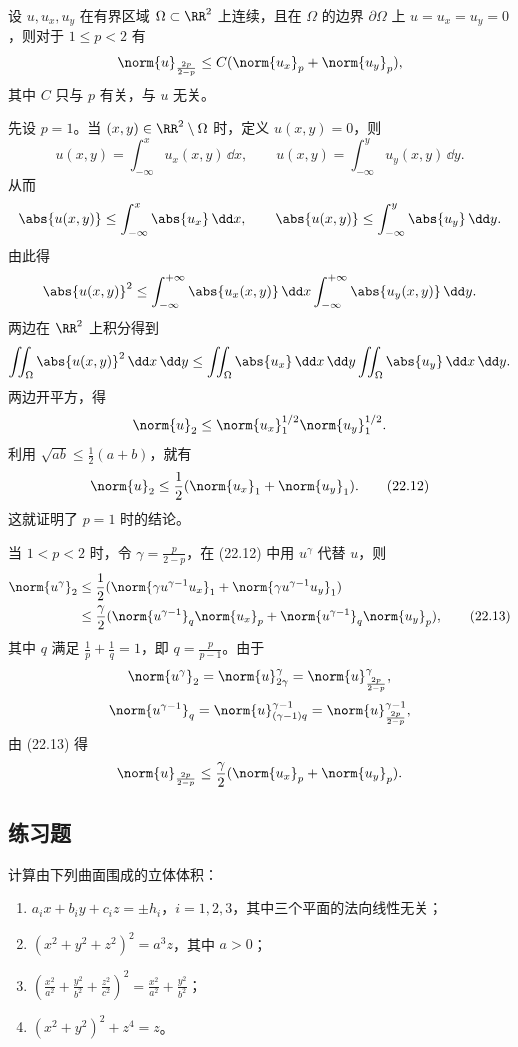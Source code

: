 \begin{xexample}[22.5.10]
设 $u,u_x,u_y$ 在有界区域 $\Omega\subset\RR^2$ 上连续，且在 $\Omega$ 的边界 $\partial\Omega$ 上 $u=u_x=u_y=0$，则对于 $1\le p<2$ 有
\[
  \norm{u}_{\frac{2p}{2-p}}\le C(\norm{u_x}_p+\norm{u_y}_p),
\]
其中 $C$ 只与 $p$ 有关，与 $u$ 无关。
\end{xexample}
\begin{xproof}
先设 $p=1$。当 $(x,y)\in\RR^2\setminus\Omega$ 时，定义 $u(x,y)=0$，则
\[
  u(x,y)=\int_{-\infty}^x u_x(x,y)\,\dd x,
  \qquad
  u(x,y)=\int_{-\infty}^y u_y(x,y)\,\dd y.
\]
从而
\[
  \abs{u(x,y)}\le\int_{-\infty}^x\abs{u_x}\,\dd x,
  \qquad
  \abs{u(x,y)}\le\int_{-\infty}^y\abs{u_y}\,\dd y.
\]
由此得
\[
  \abs{u(x,y)}^2\le\int_{-\infty}^{+\infty}\abs{u_x(x,y)}\,\dd x
  \int_{-\infty}^{+\infty}\abs{u_y(x,y)}\,\dd y.
\]
两边在 $\RR^2$ 上积分得到
\[
  \iint_\Omega\abs{u(x,y)}^2\,\dd x\,\dd y
  \le\iint_\Omega\abs{u_x}\,\dd x\,\dd y\iint_\Omega\abs{u_y}\,\dd x\,\dd y.
\]
两边开平方，得
\[
  \norm{u}_2\le\norm{u_x}_1^{1/2}\norm{u_y}_1^{1/2}.
\]
利用 $\sqrt{ab}\le\frac12(a+b)$，就有
\begin{equation}
  \norm{u}_2\le\frac12(\norm{u_x}_1+\norm{u_y}_1).
  \tag{22.12}
  \label{eq:22.12}
\end{equation}
这就证明了 $p=1$ 时的结论。

当 $1<p<2$ 时，令 $\gamma=\frac p{2-p}$，在 (22.12) 中用 $u^\gamma$ 代替 $u$，则
\begin{align}
  \norm{u^\gamma}_2
  &\le\frac12(\norm{\gamma u^{\gamma-1}u_x}_1+\norm{\gamma u^{\gamma-1}u_y}_1)\notag\\
  &\le\frac\gamma2(\norm{u^{\gamma-1}}_q\norm{u_x}_p+\norm{u^{\gamma-1}}_q\norm{u_y}_p),
  \tag{22.13}
  \label{eq:22.13}
\end{align}
其中 $q$ 满足 $\frac1p+\frac1q=1$，即 $q=\frac p{p-1}$。由于
\[
  \norm{u^\gamma}_2=\norm{u}_{2\gamma}^\gamma=\norm{u}_{\frac{2p}{2-p}}^\gamma,
\]
\[
  \norm{u^{\gamma-1}}_q=\norm{u}_{(\gamma-1)q}^{\gamma-1}
  =\norm{u}_{\frac{2p}{2-p}}^{\gamma-1},
\]
由 (22.13) 得
\[
  \norm{u}_{\frac{2p}{2-p}}\le\frac\gamma2(\norm{u_x}_p+\norm{u_y}_p).
\]
\end{xproof}

\subsection{练习题}

\begin{xexercise}[1]
计算由下列曲面围成的立体体积：
  \begin{enumerate}[label=(\arabic*)]
    \item $a_ix+b_iy+c_iz=\pm h_i$，$i=1,2,3$，其中三个平面的法向线性无关；
    \item $(x^2+y^2+z^2)^2=a^3z$，其中 $a>0$；
    \item $\displaystyle\left(\frac{x^2}{a^2}+\frac{y^2}{b^2}+\frac{z^2}{c^2}\right)^2=\frac{x^2}{a^2}+\frac{y^2}{b^2}$；
    \item $(x^2+y^2)^2+z^4=z$。
  \end{enumerate}
\end{xexercise}

